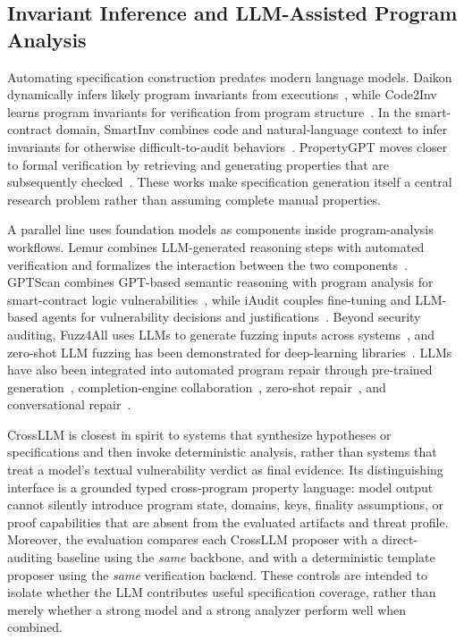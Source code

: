 \documentclass[journal]{IEEEtran}
\theoremstyle{definition}
\begin{document}
\subsection{Invariant Inference and LLM-Assisted Program Analysis}

Automating specification construction predates modern language models. Daikon dynamically infers likely program invariants from executions~\cite{ernst2001daikon}, while Code2Inv learns program invariants for verification from program structure~\cite{si2020code2inv}. In the smart-contract domain, SmartInv combines code and natural-language context to infer invariants for otherwise difficult-to-audit behaviors~\cite{wang2024smartinv}. PropertyGPT moves closer to formal verification by retrieving and generating properties that are subsequently checked~\cite{liu2025propertygpt}. These works make specification generation itself a central research problem rather than assuming complete manual properties.

A parallel line uses foundation models as components inside program-analysis workflows. Lemur combines LLM-generated reasoning steps with automated verification and formalizes the interaction between the two components~\cite{wu2024lemur}. GPTScan combines GPT-based semantic reasoning with program analysis for smart-contract logic vulnerabilities~\cite{sun2024gptscan}, while iAudit couples fine-tuning and LLM-based agents for vulnerability decisions and justifications~\cite{ma2025iaudit}. Beyond security auditing, Fuzz4All uses LLMs to generate fuzzing inputs across systems~\cite{xia2024fuzz4all}, and zero-shot LLM fuzzing has been demonstrated for deep-learning libraries~\cite{deng2023zeroshot}. LLMs have also been integrated into automated program repair through pre-trained generation~\cite{xia2023apr}, completion-engine collaboration~\cite{wei2023copiloting}, zero-shot repair~\cite{xia2022lesstraining}, and conversational repair~\cite{xia2024chatrepair}.

CrossLLM is closest in spirit to systems that synthesize hypotheses or specifications and then invoke deterministic analysis, rather than systems that treat a model's textual vulnerability verdict as final evidence. Its distinguishing interface is a grounded typed cross-program property language: model output cannot silently introduce program state, domains, keys, finality assumptions, or proof capabilities that are absent from the evaluated artifacts and threat profile. Moreover, the evaluation compares each CrossLLM proposer with a direct-auditing baseline using the \emph{same} backbone, and with a deterministic template proposer using the \emph{same} verification backend. These controls are intended to isolate whether the LLM contributes useful specification coverage, rather than merely whether a strong model and a strong analyzer perform well when combined.
\end{document}
